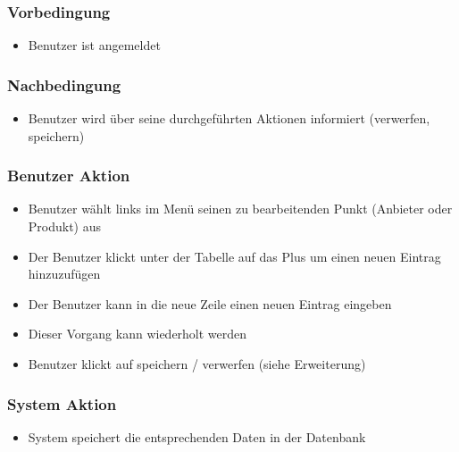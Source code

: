 \documentclass[a4paper,12pt]{article}
\begin{document}
\subsubsection{Vorbedingung}\label{vorbedingung-8}

\begin{itemize}

\item
  Benutzer ist angemeldet
\end{itemize}

\subsubsection{Nachbedingung}\label{nachbedingung-8}

\begin{itemize}

\item
  Benutzer wird über seine durchgeführten Aktionen informiert
  (verwerfen, speichern)
\end{itemize}

\subsubsection{Benutzer Aktion}\label{benutzer-aktion-8}

\begin{itemize}

\item
  Benutzer wählt links im Menü seinen zu bearbeitenden Punkt (Anbieter
  oder Produkt) aus
\item
  Der Benutzer klickt unter der Tabelle auf das Plus um einen neuen
  Eintrag hinzuzufügen
\item
  Der Benutzer kann in die neue Zeile einen neuen Eintrag eingeben
\item
  Dieser Vorgang kann wiederholt werden
\item
  Benutzer klickt auf speichern / verwerfen (siehe Erweiterung)
\end{itemize}

\subsubsection{System Aktion}\label{system-aktion-8}

\begin{itemize}

\item
  System speichert die entsprechenden Daten in der Datenbank
\end{itemize}
\end{document}
